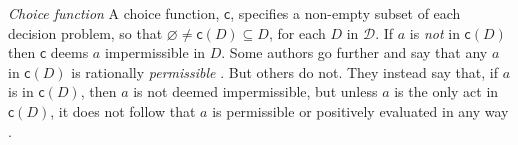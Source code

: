 \documentclass[a4paper]{article}
\newcommand{\D}{\mathcal{D}}
\renewcommand\c{\mathsf{c}} %
\renewcommand{\emptyset}{\varnothing}
\newenvironment{CCM rewritten}
{\begingroup\color{blue}} %
{\endgroup}              %
\begin{document}
{
\emph{Choice function } A choice function, $\c$, specifies a non-empty subset of each decision problem, so that $\emptyset \neq \c(D) \subseteq D$, for each $D$ in $\D$. If $a$ is \emph{not} in $\c(D)$ then $\c$ deems $a$ impermissible in $D$. Some authors go further and say that any $a$ in $\c(D)$ is rationally \emph{permissible} \citep[e.g.,][]{moss2015tse}. But others do not. They instead say that, if $a$ is in $\c(D)$, then $a$ is not deemed impermissible, but unless $a$ is the only act in $\c(D)$, it does not follow that $a$ is permissible or positively evaluated in any way \citep[e.g.,][]{debock2019iar}.}











\end{document}
